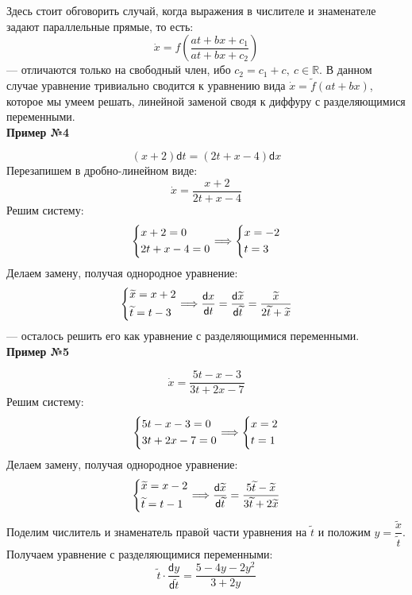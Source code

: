 \documentclass[a4paper,12pt]{article}
\newcommand{\R}{\mathbb{R}}
\renewcommand{\d}{\mathsf{d}}
\newcommand{\dx}{\dot{x}}
\newcommand{\wx}{\widetilde{x}}
\newcommand{\wt}{\widetilde{t}}
\begin{document}
Здесь стоит обговорить случай, когда выражения в числителе и знаменателе задают параллельные прямые, то есть:
\[\dx = f\left(\dfrac{at + bx + c_1}{at + bx + c_2}\right)\] --- отличаются только на свободный член, ибо $c_2 = c_1 + c,\ c \in \R$. В данном случае уравнение тривиально сводится к уравнению вида $\dx = \widetilde{f}(at + bx)$, которое мы умеем решать, линейной заменой сводя к диффуру с разделяющимися переменными.
\ \\

\textbf{Пример №4}

\[(x + 2)\d t = (2t + x - 4)\d x\]
Перезапишем в дробно-линейном виде:
\[\dx = \dfrac{x + 2}{2t + x - 4}\]
Решим систему:
\[\left\{\begin{gathered}
x + 2 = 0\hfill\\
2t + x - 4 = 0\hfill
\end{gathered}\right. \Longrightarrow \left\{\begin{gathered}
	x = -2\hfill\\
	t = 3\hfill
\end{gathered}\right.\]
Делаем замену, получая однородное уравнение:
\[\left\{\begin{gathered}
\wx = x + 2\hfill\\
\wt = t - 3\hfill
\end{gathered}\right. \Longrightarrow \dfrac{\d x}{\d t} = \dfrac{\d \wx}{\d\wt} = \dfrac{\wx}{2\wt + \wx}\] --- осталось решить его как уравнение с разделяющимися переменными.
\ \\

\textbf{Пример №5}

\[\dx = \dfrac{5t - x - 3}{3t + 2x - 7}\]
Решим систему:
\[\left\{\begin{gathered}
5t - x - 3 = 0\hfill\\
3t + 2x - 7 = 0\hfill
\end{gathered}\right. \Longrightarrow \left\{\begin{gathered}
x = 2\hfill\\
t = 1\hfill
\end{gathered}\right.\]
Делаем замену, получая однородное уравнение:
\[\left\{\begin{gathered}
\wx = x - 2\hfill\\
\wt = t - 1\hfill
\end{gathered}\right. \Longrightarrow \dfrac{\d \wx}{\d\wt} = \dfrac{5\wt - \wx}{3\wt + 2\wx}\]
Поделим числитель и знаменатель правой части уравнения на $\wt$	и положим $y = \dfrac{\wx}{\wt}$. Получаем уравнение с разделяющимися переменными:
\[\wt \cdot \dfrac{\d y}{\d \wt} = \dfrac{5 - 4y - 2y^2}{3 + 2y}\]
\end{document}

